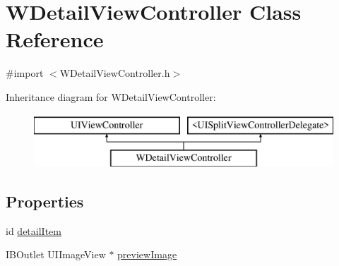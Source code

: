 \hypertarget{interface_w_detail_view_controller}{\section{W\-Detail\-View\-Controller Class Reference}
\label{interface_w_detail_view_controller}
}


{\ttfamily \#import $<$W\-Detail\-View\-Controller.\-h$>$}

Inheritance diagram for W\-Detail\-View\-Controller\-:\begin{figure}[H]
\begin{center}
\leavevmode
\includegraphics[height=2.000000cm]{interface_w_detail_view_controller}
\end{center}
\end{figure}
\subsection*{Properties}
\begin{DoxyCompactItemize}
\item 
id \hyperlink{interface_w_detail_view_controller_aed10c0ee23cc4e552b6698c89ecaff0d}{detail\-Item}
\item 
I\-B\-Outlet U\-I\-Image\-View $\ast$ \hyperlink{interface_w_detail_view_controller_a3acd4a1ff876ea51e2c5287f64dc75b4}{preview\-Image}
\end{DoxyCompactItemize}


